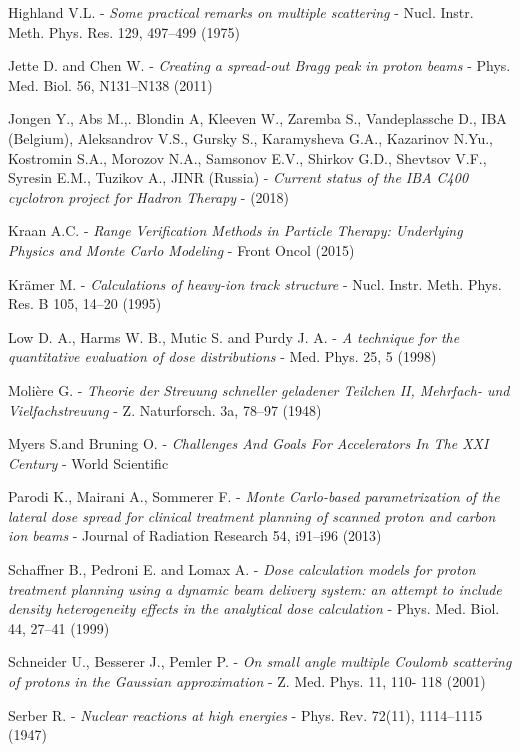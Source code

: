 \documentclass[12pt, a4paper, twoside]{book}
\begin{document}
\begin{thebibliography}{99}
Highland V.L. -
\emph{Some practical remarks on multiple scattering} -
Nucl. Instr. Meth. Phys. Res. 129, 497–499 (1975)

Jette D. and Chen W. - 
\emph{Creating a spread-out Bragg peak in proton beams} -
Phys. Med. Biol. 56, N131–N138 (2011)

Jongen Y., Abs M.,. Blondin A, Kleeven W., Zaremba S., Vandeplassche D., IBA (Belgium), Aleksandrov V.S., Gursky S., Karamysheva G.A., Kazarinov N.Yu., Kostromin S.A., Morozov N.A., Samsonov E.V., Shirkov G.D., Shevtsov V.F., Syresin E.M., Tuzikov A., JINR (Russia) - 
\emph{Current status of the IBA C400 cyclotron project for Hadron Therapy} - 
(2018)

Kraan A.C. -
\emph{Range Verification Methods in Particle Therapy: Underlying Physics and Monte Carlo Modeling} - 
Front Oncol (2015)

Krämer M. - 
\emph{Calculations of heavy-ion track structure} - 
Nucl. Instr. Meth. Phys. Res. B 105, 14–20 (1995)

Low D. A., Harms W. B., Mutic S. and Purdy J. A. -
\emph{A technique for the quantitative evaluation of dose distributions} -
Med. Phys. 25, 5 (1998)

Molière G. -
\emph{Theorie der Streuung schneller geladener Teilchen II, Mehrfach- und Vielfachstreuung} - 
Z. Naturforsch. 3a, 78–97 (1948)

Myers S.and  Bruning O. -
\emph{Challenges And Goals For Accelerators In The XXI Century} -
World Scientific

Parodi K., Mairani A., Sommerer F. -
\emph{Monte Carlo-based parametrization of the lateral dose spread for clinical treatment planning of scanned proton and carbon ion beams} -
Journal of Radiation Research 54, i91–i96 (2013)

Schaffner B., Pedroni E. and Lomax A. -
\emph{Dose calculation models for proton treatment planning using a dynamic beam delivery system: an attempt to include density heterogeneity effects in the analytical dose calculation} - 
Phys. Med. Biol. 44, 27–41 (1999)

Schneider U., Besserer J., Pemler P. - 
\emph{On small angle multiple Coulomb scattering of protons in the Gaussian approximation} - 
Z. Med. Phys. 11,  110- 118 (2001)

Serber R. - 
\emph{Nuclear reactions at high energies} -
Phys. Rev. 72(11), 1114–1115 (1947)


\end{thebibliography}
\end{document}
